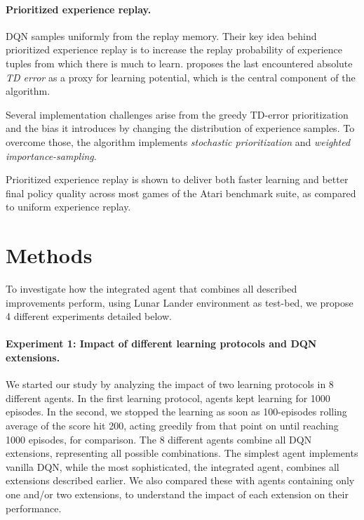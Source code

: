 \documentclass{article}
\begin{document}
    \paragraph{Prioritized experience replay.}
    DQN samples uniformly from the replay memory.
    Their key idea behind prioritized experience replay is to increase the replay probability of experience tuples from which there is much to learn.
    \cite{per} proposes the last encountered absolute \emph{TD error} as a proxy for learning potential, which is the central component of the algorithm.

    Several implementation challenges arise from the greedy TD-error prioritization and the bias it introduces by changing the distribution of experience samples.
    To overcome those, the algorithm implements \emph{stochastic prioritization} and \emph{weighted importance-sampling}.

    Prioritized experience replay is shown to deliver both faster learning and better final policy quality across most games of the Atari benchmark suite, as compared to uniform experience replay.

    \section{Methods}
    \label{sec:methods}
    To investigate how the integrated agent that combines all described improvements perform, using Lunar Lander environment as test-bed, we propose 4 different experiments detailed below.

    \paragraph{Experiment 1: Impact of different learning protocols and DQN extensions.}
    We started our study by analyzing the impact of two learning protocols in 8 different agents.
    In the first learning protocol, agents kept learning for 1000 episodes.
    In the second, we stopped the learning as soon as 100-episodes rolling average of the score hit 200, acting greedily from that point on until reaching 1000 episodes, for comparison.
    The 8 different agents combine all DQN extensions, representing all possible combinations.
    The simplest agent implements vanilla DQN, while the most sophisticated, the integrated agent, combines all extensions described earlier.
    We also compared these with agents containing only one and/or two extensions, to understand the impact of each extension on their performance.
\end{document}
